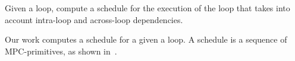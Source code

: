 \begin{problem}
Given a loop, compute a schedule for the execution of the loop that takes into account intra-loop and across-loop dependencies.
\label{problem:prob2}
\end{problem}

Our work computes a schedule for a given a loop. A schedule is a sequence of MPC-primitives, as shown in~.





